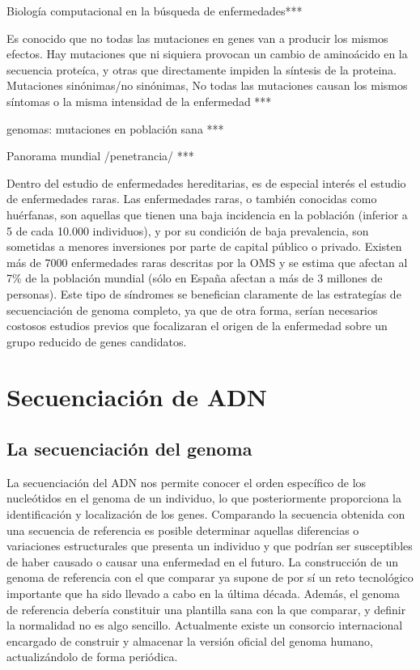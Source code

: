 \medskip
Biología computacional en la búsqueda de enfermedades***

\medskip
Es conocido que no todas las mutaciones en genes van a producir los mismos efectos. Hay mutaciones que ni siquiera provocan un cambio de aminoácido en la secuencia proteíca, y otras que directamente impiden la síntesis de la proteina. 
Mutaciones sinónimas/no sinónimas, No todas las mutaciones causan los mismos síntomas o la misma intensidad de la enfermedad ***

 genomas: mutaciones en población sana ***

\medskip
Panorama mundial /penetrancia/ ***

\medskip
Dentro del estudio de enfermedades hereditarias, es de especial interés el estudio de enfermedades raras. Las enfermedades raras, o también conocidas como huérfanas, son aquellas que tienen una baja incidencia en la población (inferior a 5 de cada 10.000 individuos), y por su condición de baja prevalencia, son sometidas a menores inversiones por parte de capital público o privado. Existen más de 7000 enfermedades raras descritas por la OMS y se estima que afectan al 7\% de la población mundial (sólo en España afectan a más de 3 millones de personas). Este tipo de síndromes se benefician claramente de las estrategías de secuenciación de genoma completo, ya que de otra forma, serían necesarios costosos estudios previos que focalizaran el origen de la enfermedad sobre un grupo reducido de genes candidatos.


\section{Secuenciación de ADN}

\subsection{La secuenciación del genoma}

La secuenciación del ADN nos permite conocer el orden específico de los nucleótidos en el genoma de un individuo, lo que posteriormente proporciona la identificación y localización de los genes. Comparando la secuencia obtenida con una secuencia de referencia es posible determinar aquellas diferencias o variaciones estructurales que presenta un individuo y que podrían ser susceptibles de haber causado o causar una enfermedad en el futuro. La construcción de un genoma de referencia con el que comparar ya supone de por sí un reto tecnológico importante que ha sido llevado a cabo en la última década. Además, el genoma de referencia debería constituir una plantilla sana con la que comparar, y definir la normalidad no es algo sencillo. Actualmente existe un consorcio internacional \cite{GRC} encargado de construir y almacenar la versión oficial del genoma humano, actualizándolo de forma periódica. 

